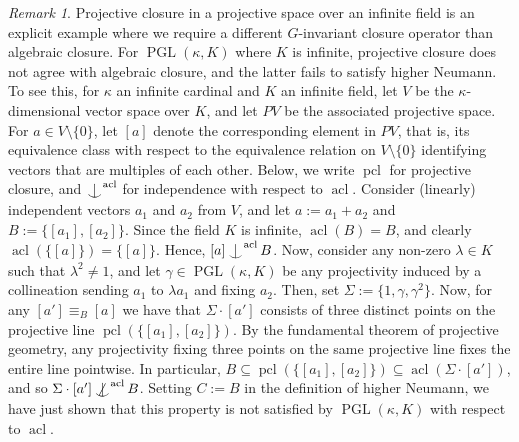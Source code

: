 \documentclass{article}
\theoremstyle{remark}
\newtheorem{remark}[theorem]{Remark}
\theoremstyle{definition}
\DeclareMathOperator{\pcl}{pcl}
\DeclareMathOperator{\acl}{acl}
\DeclareMathOperator{\PGL}{PGL}
\def\Ind#1#2{#1\setbox0=\hbox{$#1x$}\kern\wd0\hbox to 0pt{\hss$#1\mid$\hss}
	\lower.9\ht0\hbox to 0pt{\hss$#1\smile$\hss}\kern\wd0}
\def\ind{\mathop{\mathpalette\Ind{}}}
\def\Notind#1#2{#1\setbox0=\hbox{$#1x$}\kern\wd0\hbox to 0pt{\mathchardef
		\nn="3236\hss$#1\nn$\kern1.4\wd0\hss}\hbox to
	0pt{\hss$#1\mid$\hss}\lower.9\ht0
	\hbox to 0pt{\hss$#1\smile$\hss}\kern\wd0}
\def\nind{\mathop{\mathpalette\Notind{}}}
\begin{document}
{\begin{remark}
    {Projective closure in {a projective space over an} %
     infinite field  is an explicit example where %
    {we require} a different $G$-invariant closure operator than algebraic closure. For $\PGL(\kappa, K)$ where $K$ is infinite, projective closure does not agree with algebraic closure, {and the latter fails to satisfy}} 
{higher Neumann. To see this, for $\kappa$ an infinite cardinal and $K$ an infinite field, let $V$ be the $\kappa$-dimensional vector space over $K$, and let $PV$ be the associated projective space. For $a\in V\setminus\{0\}$, let $[a]$ denote the corresponding element in $PV$, that is, its  equivalence class  with respect to the equivalence relation
on $V\setminus\{0\}$ identifying vectors that are multiples of each other.
 Below, we write $\pcl$ for projective closure, and $\ind^{\acl}$ for independence with respect to $\acl$. Consider (linearly) independent vectors $a_1$ and $a_2$ from $V$, and let $a:=a_1+a_2$ and $B:=\{[a_1], [a_2]\}$. %
  Since the field $K$ is infinite, $\acl(B)=B$, and clearly $\acl(\{[a]\})=\{[a]\}$. Hence,  $[a]\ind^{\acl} B$. Now, consider any non-zero $\lambda\in K$ such that $\lambda^2\neq 1$, and let $\gamma\in\PGL(\kappa, K)$ be any projectivity induced by a collineation sending $a_1$ to $\lambda a_1$ and fixing $a_2$. Then, set $\Sigma:=\{1, \gamma, \gamma^2\}$. Now, for any ${[a']}\equiv_B [a]$ we have that $\Sigma \cdot {[a']}$ consists of three distinct points on the projective line $\pcl(\{[a_1], [a_2]\})$. By the fundamental theorem of projective geometry, any projectivity fixing three points on the same projective line fixes the entire line pointwise. In particular, $B\subseteq \pcl(\{[a_1], [a_2]\})\subseteq {\acl}(\Sigma \cdot {[a']})$, and so $\Sigma\cdot {[a']}\nind^{\acl} B$. Setting $C:=B$ in the definition of higher Neumann, we have just shown that this property is not satisfied by $\PGL(\kappa, K)$  with respect to $\acl$.} 
\end{remark}

}
\end{document}
